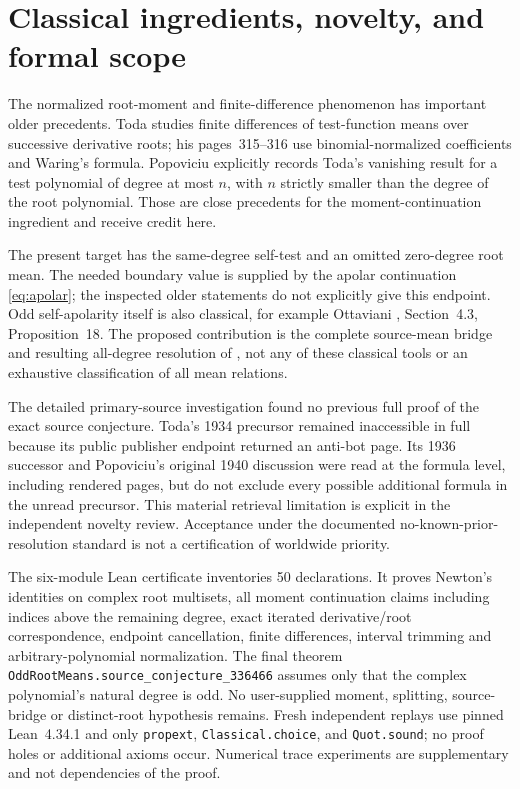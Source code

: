\documentclass[11pt]{article}
\begin{document}
\section{Classical ingredients, novelty, and formal scope}
The normalized root-moment and finite-difference phenomenon has important
older precedents. Toda \cite{Toda36} studies finite differences of
test-function means over successive derivative roots; his pages~315--316
use binomial-normalized coefficients and Waring's formula. Popoviciu
\cite{Pop} explicitly records Toda's vanishing result for a test
polynomial of degree at most $n$, with $n$ strictly smaller than the
degree of the root polynomial. Those are close precedents for the
moment-continuation ingredient and receive credit here.

The present target has the same-degree self-test and an omitted
zero-degree root mean. The needed boundary value is supplied by the
apolar continuation \eqref{eq:apolar}; the inspected older statements do
not explicitly give this endpoint. Odd self-apolarity itself is also
classical, for example Ottaviani \cite{Ott}, Section~4.3, Proposition~18.
The proposed contribution is the complete source-mean bridge and
resulting all-degree resolution of \cite{WWB}, not any of these classical
tools or an exhaustive classification of all mean relations.

The detailed primary-source investigation found no previous full proof
of the exact source conjecture. Toda's 1934 precursor \cite{Toda34}
remained inaccessible in full because its public publisher endpoint
returned an anti-bot page. Its 1936 successor and Popoviciu's original
1940 discussion were read at the formula level, including rendered
pages, but do not exclude every possible additional formula in the
unread precursor. This material retrieval limitation is explicit in
the independent novelty review. Acceptance under the documented
no-known-prior-resolution standard is not a certification of worldwide
priority.

The six-module Lean certificate inventories 50 declarations. It proves
Newton's identities on complex root multisets, all moment continuation
claims including indices above the remaining degree, exact iterated
derivative/root correspondence, endpoint cancellation, finite
differences, interval trimming and arbitrary-polynomial normalization.
The final theorem
\texttt{OddRootMeans.source\_conjecture\_336466} assumes only that the
complex polynomial's natural degree is odd. No user-supplied moment,
splitting, source-bridge or distinct-root hypothesis remains. Fresh
independent replays use pinned Lean~4.34.1 and only \texttt{propext},
\texttt{Classical.choice}, and \texttt{Quot.sound}; no proof holes or
additional axioms occur. Numerical trace experiments are supplementary
and not dependencies of the proof.
\end{document}
